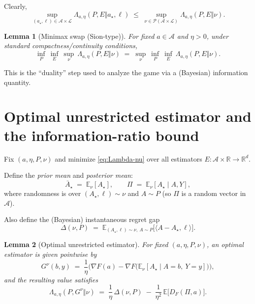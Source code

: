 \documentclass[11pt]{article}
\newcommand{\R}{\mathbb{R}}
\newcommand{\Rd}{\mathbb{R}^d}
\newcommand{\E}{\mathbb{E}}
\newcommand{\ip}[2]{\langle #1,#2\rangle}
\newcommand{\cA}{\mathcal{A}}
\newcommand{\cL}{\mathcal{L}}
\newcommand{\cP}{\mathcal{P}}
\newcommand{\pr}{\bar A_\star}   %
\newcommand{\po}{\Pi}           %
\theoremstyle{definition}
\theoremstyle{plain}
\newtheorem{lemma}{Lemma}
\theoremstyle{remark}
\begin{document}
Clearly,
\[
    \sup_{(a_\star,\ell)\in\cA\times\cL}\Lambda_{a,\eta}(P,E\Vert a_\star,\ell)
    \;\le\;
    \sup_{\nu\in\cP(\cA\times\cL)}\Lambda_{a,\eta}(P,E\Vert \nu).
\]

\begin{lemma}[Minimax swap (Sion-type)]
    \label{lem:minimax}
    For fixed $a\in\cA$ and $\eta>0$, under standard compactness/continuity conditions,
    \[
        \inf_{P}\ \inf_{E}\ \sup_{\nu}\ \Lambda_{a,\eta}(P,E\Vert \nu)
        \;=\;
        \sup_{\nu}\ \inf_{P}\ \inf_{E}\ \Lambda_{a,\eta}(P,E\Vert \nu).
    \]
\end{lemma}

This is the ``duality'' step used to analyze the game via a (Bayesian) information quantity.

\section{Optimal unrestricted estimator and the information-ratio bound}

Fix $(a,\eta,P,\nu)$ and minimize \eqref{eq:Lambda-nu} over all estimators $E:\cA\times\R\to\Rd$.

Define the \emph{prior mean} and \emph{posterior mean}:
\[
    \pr \;=\; \E_\nu[A_\star],
    \qquad
    \po \;=\; \E_\nu[A_\star \mid A,Y],
\]
where randomness is over $(A_\star,\ell)\sim\nu$ and $A\sim P$ (so $\po$ is a random vector in $\cA$).

Also define the (Bayesian) instantaneous regret gap
\begin{equation}
    \label{eq:Delta}
    \Delta(\nu,P)
    \;=\;
    \E_{(A_\star,\ell)\sim\nu,\ A\sim P}\!\big[\ip{A-A_\star}{\ell}\big].
\end{equation}

\begin{lemma}[Optimal unrestricted estimator]
    \label{lem:opt-unrestricted}
    For fixed $(a,\eta,P,\nu)$, an optimal estimator is given pointwise by
    \[
        G^\nu(b,y)
        \;=\;
        \frac{1}{\eta}\Big(\nabla F(a)-\nabla F\big(\E_\nu[A_\star\mid A=b,\ Y=y]\big)\Big),
    \]
    and the resulting value satisfies
    \begin{equation}
        \label{eq:Lambda-unrestricted}
        \Lambda_{a,\eta}(P,G^\nu \Vert \nu)
        \;=\;
        \frac{1}{\eta}\,\Delta(\nu,P)
        \;-\;
        \frac{1}{\eta^2}\,\E\!\big[D_F(\po,a)\big].
    \end{equation}
\end{lemma}
\end{document}
